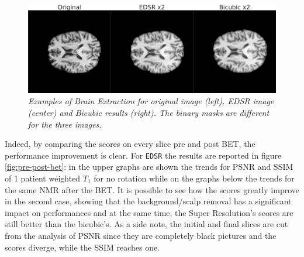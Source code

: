 \documentclass[12pt,a4paper]{report}
\begin{document}
\begin{figure}[H]
  \centering
  \includegraphics[scale=0.31]{./images/bet_example.png}
 \caption{\it Examples of Brain Extraction for original image (left), EDSR image (center) and Bicubic results (right). The binary masks are different for the three images.}
 \label{fig:bet-example}
\end{figure}

Indeed, by comparing the scores on every slice pre and post BET, the performance improvement is clear. 
For {\tt EDSR} the results are reported in figure \ref{fig:pre-post-bet}: in the upper graphs are shown the trends for PSNR and SSIM of 1 patient weighted $T_1$ for no rotation while on the graphs below the trends for the same NMR after the BET. 
It is possible to see how the scores greatly improve in the second case, showing that the background/scalp removal has a significant impact on performances and at the same time, the Super Resolution's scores are still better than the bicubic's.
As a side note, the initial and final slices are cut from the analysis of PSNR since they are completely black pictures and the scores diverge, while the SSIM reaches one.
\end{document}
